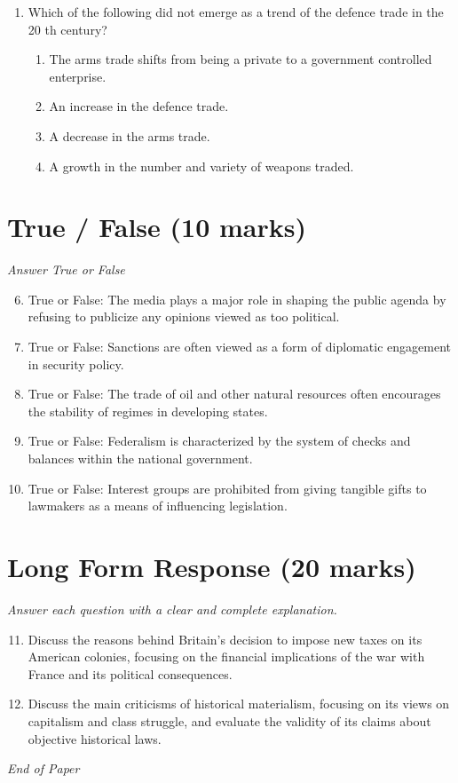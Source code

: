 \documentclass[12pt]{article}
\begin{document}
\begin{enumerate}[label=\arabic*.]
\begin{enumerate}[label=(\alph*)]
    \item the Bush Doctrine.
    \item the Monroe Doctrine.
\end{enumerate}
\item Which of the following did not emerge as a trend of the defence trade in the 20 th century?
\begin{enumerate}[label=(\alph*)]
    \item The arms trade shifts from being a private to a government controlled enterprise.
    \item An increase in the defence trade.
    \item A decrease in the arms trade.
    \item A growth in the number and variety of weapons traded.
\end{enumerate}
\end{enumerate}

\section*{True / False (10 marks)}
\textit{Answer True or False}
\begin{enumerate}[label=\arabic*.]
\setcounter{enumi}{5}
\item True or False: The media plays a major role in shaping the public agenda by refusing to publicize any opinions viewed as too political.
\item True or False: Sanctions are often viewed as a form of diplomatic engagement in security policy.
\item True or False: The trade of oil and other natural resources often encourages the stability of regimes in developing states.
\item True or False: Federalism is characterized by the system of checks and balances within the national government.
\item True or False: Interest groups are prohibited from giving tangible gifts to lawmakers as a means of influencing legislation.
\end{enumerate}

\section*{Long Form Response (20 marks)}
\textit{Answer each question with a clear and complete explanation.}
\begin{enumerate}[label=\arabic*.]
\setcounter{enumi}{10}
\item Discuss the reasons behind Britain's decision to impose new taxes on its American colonies, focusing on the financial implications of the war with France and its political consequences.
\item Discuss the main criticisms of historical materialism, focusing on its views on capitalism and class struggle, and evaluate the validity of its claims about objective historical laws.
\end{enumerate}

\vfill
\noindent\textit{End of Paper}
\end{document}
